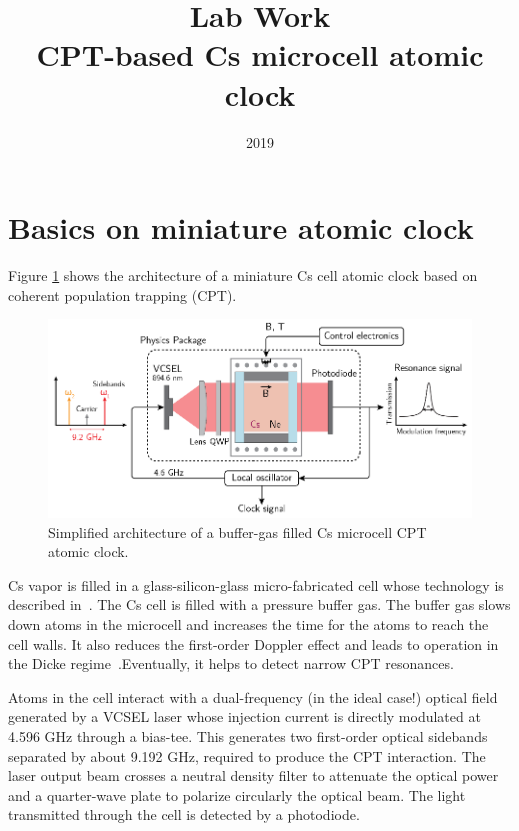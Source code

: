 \documentclass[a4paper,11pt]{article}
\title{Lab Work \\ CPT-based Cs microcell atomic clock}
\author{}
\date{2019}
\begin{document}
\maketitle

\tableofcontents 

\section{Basics on miniature atomic clock}
Figure \ref{fig:globalcpt} shows the architecture of a miniature Cs cell atomic clock based on coherent population trapping (CPT).

\begin{figure}[h!]
	\centering
	\includegraphics[width=0.7\linewidth]{globalCPT}
	\caption{Simplified architecture of a buffer-gas filled Cs microcell CPT atomic clock.}
	\label{fig:globalcpt}
\end{figure}

Cs vapor is filled in a glass-silicon-glass micro-fabricated cell whose technology is described in~\cite{hasegawa}. The Cs cell is filled with a pressure buffer gas. The buffer gas slows down atoms in the microcell and increases the time for the atoms to reach the cell walls. It also reduces the first-order Doppler effect and leads to operation in the Dicke regime~\cite{dicke}.Eventually, it helps to detect narrow CPT resonances.

Atoms in the cell interact with a dual-frequency (in the ideal case!) optical field generated by a VCSEL laser whose injection current is directly modulated at 4.596 GHz through a bias-tee. This generates two first-order optical sidebands separated by about 9.192 GHz, required to produce the CPT interaction. The laser output beam crosses a neutral density filter to attenuate the optical power and a quarter-wave plate to polarize circularly the optical beam. The light transmitted through the cell is detected by a photodiode.
\end{document}
